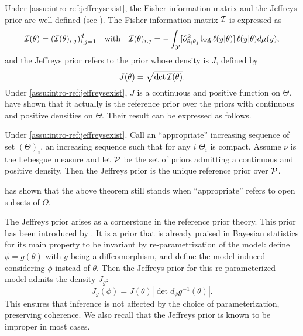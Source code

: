 Under \cref{assu:intro-ref:jeffreysexist}, the Fisher information matrix and the Jeffreys prior are well-defined (see \cite{lehmann_elements_1999}). The Fisher information matrix $\mathcal{I}$ is expressed as
    \begin{equation}
        \mathcal{I}(\theta) = (\mathcal{I}(\theta)_{i,j})_{i,j=1}^d\quad \text{with}\quad \mathcal{I}(\theta)_{i,j}= - \int_{\mathcal{Y}}[\partial^2_{\theta_i\theta_j}\log\ell(y|\theta)]\, \ell(y|\theta)d\mu(y),
    \end{equation}
and the Jeffreys prior refers to the prior whose density is $J$, defined by
    \begin{equation}
        J(\theta) = \sqrt{\det\mathcal{I}(\theta)}.
    \end{equation}
Under \cref{assu:intro-ref:jeffreysexist}, $J$ is a continuous and positive function on $\Theta$. \citet{clarke_jeffreys_1994} have shown that it actually is the reference prior over the priors with continuous and positive densities on $\Theta$. Their result can be expressed as follows.
    \begin{thm}\label{thm:intro-ref:clarke}
        Under \cref{assu:intro-ref:jeffreysexist}. Call an ``appropriate'' increasing sequence of set $(\Theta)_i$, an increasing sequence such that for any $i$ $\Theta_i$ is compact. Assume $\nu$ is the Lebesgue measure and let $\mathcal{P}$ be the set of priors admitting a continuous and positive density. Then the Jeffreys prior is the unique reference prior over $\mathcal{P}$.
    \end{thm}
\citet{mure_objective_2018} has shown that the above theorem still stands when ``appropriate'' refers to open subsets of $\Theta$.


The Jeffreys prior arises as a cornerstone in the reference prior theory.
This prior has been introduced by \citet{jeffreys_invariant_1946}. It is a prior that is already praised in Bayesian statistics for its main property to be invariant by re-parametrization of the model:
define $\phi=g(\theta)$ with $g$ being a diffeomorphism, and define the model induced considering $\phi$ instead of $\theta$. Then the Jeffreys prior for this re-parameterized model admits the density $J_g$:
    \begin{equation}
        J_g(\phi) = J(\theta) %
        |\det d_\phi g^{-1}(\theta)|.
    \end{equation}
This ensures that inference is not affected by the choice of parameterization, preserving coherence.
We also recall that the Jeffreys prior is known to be improper in most cases.



